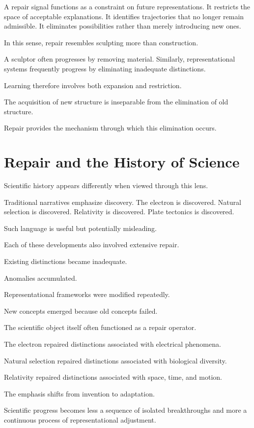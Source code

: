 \documentclass[11pt,oneside,openany]{book}
\begin{document}
A repair signal functions as a constraint on future representations. It restricts the space of acceptable explanations. It identifies trajectories that no longer remain admissible. It eliminates possibilities rather than merely introducing new ones.

In this sense, repair resembles sculpting more than construction.

A sculptor often progresses by removing material. Similarly, representational systems frequently progress by eliminating inadequate distinctions.

Learning therefore involves both expansion and restriction.

The acquisition of new structure is inseparable from the elimination of old structure.

Repair provides the mechanism through which this elimination occurs.

\section{Repair and the History of Science}

Scientific history appears differently when viewed through this lens.

Traditional narratives emphasize discovery. The electron is discovered. Natural selection is discovered. Relativity is discovered. Plate tectonics is discovered.

Such language is useful but potentially misleading.

Each of these developments also involved extensive repair.

Existing distinctions became inadequate.

Anomalies accumulated.

Representational frameworks were modified repeatedly.

New concepts emerged because old concepts failed.

The scientific object itself often functioned as a repair operator.

The electron repaired distinctions associated with electrical phenomena.

Natural selection repaired distinctions associated with biological diversity.

Relativity repaired distinctions associated with space, time, and motion.

The emphasis shifts from invention to adaptation.

Scientific progress becomes less a sequence of isolated breakthroughs and more a continuous process of representational adjustment.
\end{document}
